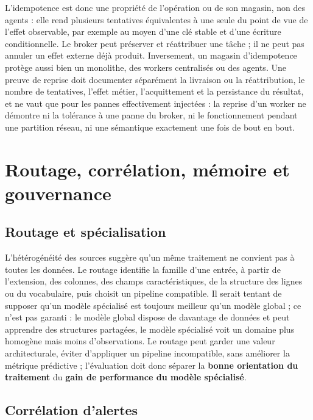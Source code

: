 L'idempotence est donc une propriété de l'opération ou de son magasin, non des agents : elle rend plusieurs tentatives équivalentes à une seule du point de vue de l'effet observable, par exemple au moyen d'une clé stable et d'une écriture conditionnelle. Le broker peut préserver et réattribuer une tâche ; il ne peut pas annuler un effet externe déjà produit. Inversement, un magasin d'idempotence protège aussi bien un monolithe, des workers centralisés ou des agents. Une preuve de reprise doit documenter séparément la livraison ou la réattribution, le nombre de tentatives, l'effet métier, l'acquittement et la persistance du résultat, et ne vaut que pour les pannes effectivement injectées : la reprise d'un worker ne démontre ni la tolérance à une panne du broker, ni le fonctionnement pendant une partition réseau, ni une sémantique exactement une fois de bout en bout.

\section{Routage, corrélation, mémoire et gouvernance}

\subsection{Routage et spécialisation}

L'hétérogénéité des sources suggère qu'un même traitement ne convient pas à toutes les données. Le routage identifie la famille d'une entrée, à partir de l'extension, des colonnes, des champs caractéristiques, de la structure des lignes ou du vocabulaire, puis choisit un pipeline compatible. Il serait tentant de supposer qu'un modèle spécialisé est toujours meilleur qu'un modèle global ; ce n'est pas garanti : le modèle global dispose de davantage de données et peut apprendre des structures partagées, le modèle spécialisé voit un domaine plus homogène mais moins d'observations. Le routage peut garder une valeur architecturale, éviter d'appliquer un pipeline incompatible, sans améliorer la métrique prédictive ; l'évaluation doit donc séparer la \textbf{bonne orientation du traitement} du \textbf{gain de performance du modèle spécialisé}.

\subsection{Corrélation d'alertes}

